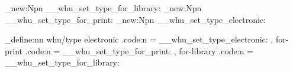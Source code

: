 

\cs_new:Npn \__whu_set_type_for_library: { }
\cs_new:Npn \__whu_set_type_for_print: { }
\cs_new:Npn \__whu_set_type_electronic: { }

\keys_define:nn { whu/type }
  {
    electronic .code:n = \__whu_set_type_electronic:
  , for-print .code:n = \__whu_set_type_for_print:
  , for-library .code:n = \__whu_set_type_for_library:
  }



